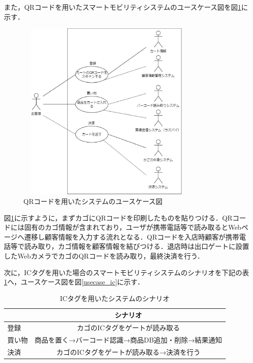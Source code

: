 また，QRコードを用いたスマートモビリティシステムのユースケース図を図\ref{usecase_qr}に示す．

\begin{figure}[htbp]
\centering
\includegraphics[height = 9cm,width = 9cm]{./picture/usecase_qr.eps}
\caption{QRコードを用いたシステムのユースケース図}
\label{usecase_qr}
\end{figure}

図\ref{usecase_qr}に示すように，まずカゴにQRコードを印刷したものを貼りつける．QRコードには固有のカゴ情報が含まれており，ユーザが携帯電話等で読み取るとWebページへ遷移し顧客情報を入力する流れとなる．QRコードを入店時顧客が携帯電話等で読み取り，カゴ情報を顧客情報を結びつける．退店時は出口ゲートに設置したWebカメラでカゴのQRコードを読み取り，最終決済を行う．


次に，ICタグを用いた場合のスマートモビリティシステムのシナリオを下記の表\ref{sina_ic}へ，ユースケース図を図\ref{usecase_ic}に示す．


\begin{table}[htb]
\begin{center}
\caption{ICタグを用いたシステムのシナリオ}
\begin{tabular}{|l|c|} \hline
 & シナリオ \\ \hline \hline
登録 & カゴのICタグをゲートが読み取る \\
買い物 & 商品を置く→バーコード認識→商品DB追加・削除→結果通知 \\
決済 & カゴのICタグをゲートが読み取る→決済を行う \\ \hline
\end{tabular}
\label{sina_ic}
\end{center}
\end{table}


